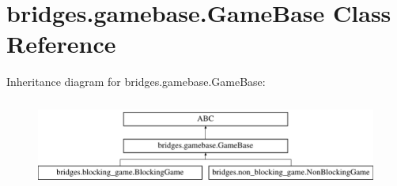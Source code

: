 \hypertarget{classbridges_1_1gamebase_1_1_game_base}{}\section{bridges.\+gamebase.\+Game\+Base Class Reference}
\label{classbridges_1_1gamebase_1_1_game_base}
Inheritance diagram for bridges.\+gamebase.\+Game\+Base\+:\begin{figure}[H]
\begin{center}
\leavevmode
\includegraphics[height=2.947368cm]{classbridges_1_1gamebase_1_1_game_base}
\end{center}
\end{figure}
